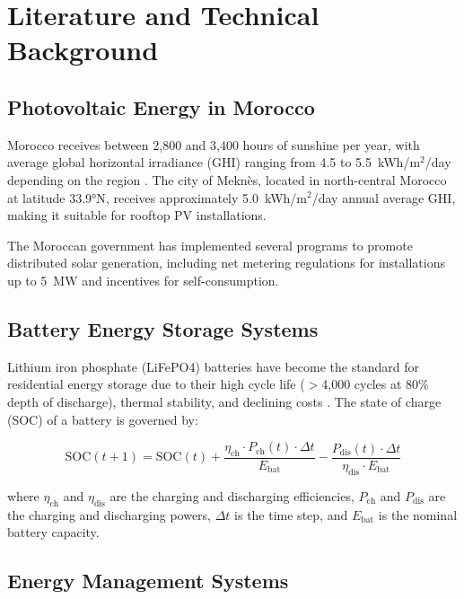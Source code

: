 \chapter{Literature and Technical Background}
\label{ch:literature}

\section{Photovoltaic Energy in Morocco}

Morocco receives between 2,800 and 3,400 hours of sunshine per year, with average global horizontal irradiance (GHI) ranging from 4.5 to 5.5~kWh/m$^2$/day depending on the region \cite{morocco_energy}. The city of Meknès, located in north-central Morocco at latitude 33.9°N, receives approximately 5.0~kWh/m$^2$/day annual average GHI, making it suitable for rooftop PV installations.

The Moroccan government has implemented several programs to promote distributed solar generation, including net metering regulations for installations up to 5~MW and incentives for self-consumption.

\section{Battery Energy Storage Systems}

Lithium iron phosphate (LiFePO4) batteries have become the standard for residential energy storage due to their high cycle life ($>$4,000 cycles at 80\% depth of discharge), thermal stability, and declining costs \cite{lifep04}. The state of charge (SOC) of a battery is governed by:

\begin{equation}
    \text{SOC}(t+1) = \text{SOC}(t) + \frac{\eta_{\text{ch}} \cdot P_{\text{ch}}(t) \cdot \Delta t}{E_{\text{bat}}} - \frac{P_{\text{dis}}(t) \cdot \Delta t}{\eta_{\text{dis}} \cdot E_{\text{bat}}}
    \label{eq:soc}
\end{equation}

where $\eta_{\text{ch}}$ and $\eta_{\text{dis}}$ are the charging and discharging efficiencies, $P_{\text{ch}}$ and $P_{\text{dis}}$ are the charging and discharging powers, $\Delta t$ is the time step, and $E_{\text{bat}}$ is the nominal battery capacity.

\section{Energy Management Systems}

